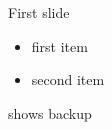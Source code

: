 \documentclass[8pt]{beamer}
\begin{document}
    \begin{frame}
        \titlepage
    \end{frame}

    \begin{frame}{First slide}
        \begin{itemize}
            \item first item
            \item second item
        \end{itemize}
    \end{frame}

    \backup
    {
        \begin{frame}
            shows backup
        \end{frame}
    }
\end{document}
